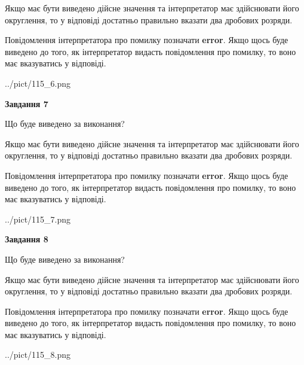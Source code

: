 \documentclass[12pt, ukrainian]{article}
\begin{document}
{\begin {Large}
Якщо має бути виведено дійсне значення та інтерпретатор має здійснювати його округлення, 
то у відповіді достатньо правильно вказати два дробових розряди.

Повідомлення інтерпретатора про помилку позначати \textbf{error}.
Якщо щось буде виведено до того, як інтерпретатор видасть повідомлення про помилку, 
то воно має вказуватись у відповіді. \par

\begin{center}
	{../pict/115_6.png}
\end{center}
\newpage

{\begin {center}\textbf{Завдання 7}\end {center}}\par
Що буде виведено за виконання? \par

Якщо має бути виведено дійсне значення та інтерпретатор має здійснювати його округлення, 
то у відповіді достатньо правильно вказати два дробових розряди.

Повідомлення інтерпретатора про помилку позначати \textbf{error}.
Якщо щось буде виведено до того, як інтерпретатор видасть повідомлення про помилку, 
то воно має вказуватись у відповіді. \par

\begin{center}
	{../pict/115_7.png}
\end{center}
\newpage

{\begin {center}\textbf{Завдання 8}\end {center}}\par
Що буде виведено за виконання? \par

Якщо має бути виведено дійсне значення та інтерпретатор має здійснювати його округлення, 
то у відповіді достатньо правильно вказати два дробових розряди.

Повідомлення інтерпретатора про помилку позначати \textbf{error}.
Якщо щось буде виведено до того, як інтерпретатор видасть повідомлення про помилку, 
то воно має вказуватись у відповіді. \par

\begin{center}
	{../pict/115_8.png}
\end{center}
\newpage


\end{Large}}
\end{document}

